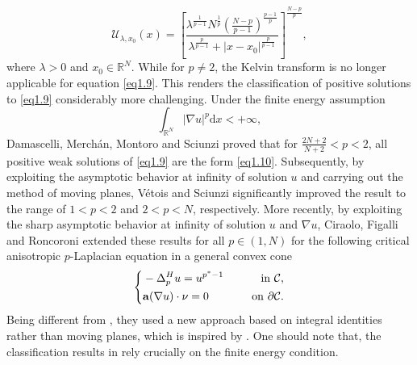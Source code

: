 \documentclass[12pt]{amsart}
\theoremstyle{definition}
\theoremstyle{remark}
\theoremstyle{conclusion}
\theoremstyle{conjecture}
\numberwithin{equation}{section}
\begin{document}
\begin{equation}\label{eq1.10}
  \mathcal{U}_{\lambda,x_0}(x)=\left[\frac{\lambda^{\frac{1}{p-1}}N^{\frac{1}{p}}(\frac{N-p}{p-1})^{\frac{p-1}{p}}}{\lambda^{\frac{p}{p-1}}+|x-x_0|^{\frac{p}{p-1}}}\right]^{\frac{N-p}{p}},
\end{equation}
where $\lambda>0$ and $x_0\in\mathbb{R}^N$. While for $p\neq2$, the Kelvin transform is no longer applicable for equation \eqref{eq1.9}. This renders the classification of positive solutions to \eqref{eq1.9} considerably more challenging. Under the finite energy assumption
\begin{equation}\label{finite energy}
  \int_{\mathbb{R}^N}|\nabla u|^p\mathrm{d}x<+\infty,
\end{equation}
Damascelli, Merch\'an, Montoro and Sciunzi \cite{DMMS} proved that for $\frac{2N+2}{N+2}<p<2$, all positive weak solutions of \eqref{eq1.9} are the form \eqref{eq1.10}. Subsequently, by exploiting the asymptotic behavior at infinity of solution $u$ and carrying out the method of moving planes, V\'etois \cite{Ve} and Sciunzi \cite{Sc} significantly improved the result  to the range of $1<p<2$ and $2<p<N$, respectively. More recently, by exploiting the sharp asymptotic behavior at infinity of solution $u$ and $\nabla u$, Ciraolo, Figalli and Roncoroni \cite{CFR} extended these results for all $p\in(1,N)$ for the following critical anisotropic $p$-Laplacian equation in a general convex cone
 \begin{equation*}
      \left\{
          \begin{aligned}
          &-\Delta ^{H}_{p}u=u^{p^*-1} \quad\,\,\, &{\rm{in}} \,\, \mathcal{C}, \\
          &{\bf{a}}(\nabla u)\cdot \nu =0 \quad\,\,\, &{\rm{on}} \,\, \partial\mathcal{C}.
          \end{aligned}
          \right.
    \end{equation*}
Being different from \cite{DMMS,Ve,Sc}, they used a new approach based on integral identities rather than moving planes, which is inspired by \cite{SZ}. One should note that, the classification results in \cite{CFR,DMMS,Sc,Ve} rely crucially on the finite energy condition.

\smallskip
\end{document}
